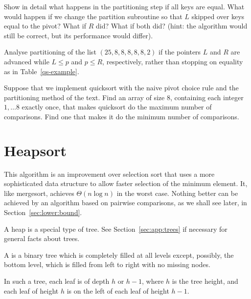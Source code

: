 \begin{Exercise}\label{exr:qs-equal-keys-partition}
Show in detail what happens in the partitioning step if all keys are equal. 
What would happen if we change the partition subroutine so that 
$L$ skipped over keys equal to the pivot? What if $R$ did? 
What if both did? (hint: the algorithm would still be correct, but its performance 
would differ).
\end{Exercise}

\begin{Exercise}\label{exr:qs-bad:partition}
Analyse partitioning of the list
$(25, 8, 8, 8, 8, 8, 2)$ if the pointers $L$ and $R$ are advanced
while \(L \le p\) and \(p \le R\), respectively, rather than stopping on 
equality as in Table~\ref{qs-example}.
\end{Exercise}

\begin{Exercise} \label{exr:quicksort-extremes}
Suppose that we implement quicksort with the naive pivot choice rule and the 
partitioning method of the text. Find an array of size 8, containing each 
integer $1, \dots 8$ exactly once, that makes quicksort do the maximum number 
of comparisons. Find one that makes it do the minimum number of comparisons.
\end{Exercise}


\section{Heapsort}\label{sec:heapsort}

This algorithm is an improvement over selection sort that uses a more 
sophisticated data structure to allow faster selection of the minimum element. 
It, like mergesort, achieves $\Theta(n \log n)$ in the worst case. Nothing 
better can be achieved by an algorithm based on pairwise comparisons, as we 
shall see later, in Section~\ref{sec:lower:bound}.

A heap is a special type of tree. 
See Section~\ref{sec:app:trees} if necessary for general facts about trees.

\begin{Definition}
A  is a binary tree which is completely filled 
at all levels except, possibly, the bottom level, which is filled from left to
right with no missing nodes.
\end{Definition}

In such a tree, each leaf is of depth $h$ or $h-1$, where $h$ is the tree height, 
and each leaf of height $h$ is on the left of each leaf of height $h-1$.

